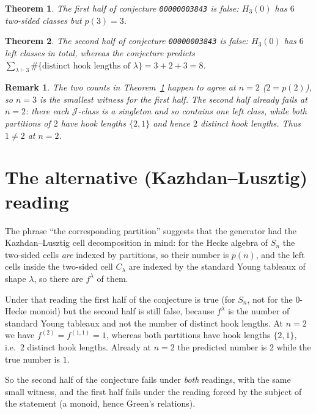 \documentclass[11pt]{article}
\newtheorem{theorem}{Theorem}
\newtheorem{remark}{Remark}
\begin{document}
\begin{theorem}\label{thm:one}
The first half of conjecture \texttt{00000003843} is false: $H_3(0)$ has $6$
two-sided classes but $p(3) = 3$.
\end{theorem}

\begin{theorem}\label{thm:two}
The second half of conjecture \texttt{00000003843} is false: $H_3(0)$ has $6$
left classes in total, whereas the conjecture predicts
$\sum_{\lambda\vdash 3}\#\{\text{distinct hook lengths of }\lambda\}
= 3 + 2 + 3 = 8$.
\end{theorem}

\begin{remark}
The two counts in Theorem~\ref{thm:one} happen to agree at $n = 2$
($2 = p(2)$), so $n = 3$ is the smallest witness for the first half.  The second
half already fails at $n = 2$: there each $\mathcal{J}$-class is a singleton and
so contains one left class, while both partitions of $2$ have hook lengths
$\{2,1\}$ and hence $2$ distinct hook lengths.  Thus $1 \ne 2$ at $n = 2$.
\end{remark}

\section{The alternative (Kazhdan--Lusztig) reading}
\label{sec:kl}

The phrase ``the corresponding partition'' suggests that the generator had the
Kazhdan--Lusztig cell decomposition in mind: for the Hecke algebra of $S_n$ the
two-sided cells \emph{are} indexed by partitions, so their number is $p(n)$, and
the left cells inside the two-sided cell $C_\lambda$ are indexed by the standard
Young tableaux of shape $\lambda$, so there are $f^\lambda$ of them.

Under that reading the first half of the conjecture is true (for $S_n$, not for
the $0$-Hecke monoid) but the second half is still false, because
$f^\lambda$ is the number of standard Young tableaux and not the number of
distinct hook lengths.  At $n = 2$ we have $f^{(2)} = f^{(1,1)} = 1$, whereas
both partitions have hook lengths $\{2,1\}$, i.e.\ $2$ distinct hook lengths.
Already at $n = 2$ the predicted number is $2$ while the true number is $1$.

So the second half of the conjecture fails under \emph{both} readings, with the
same small witness, and the first half fails under the reading forced by the
subject of the statement (a monoid, hence Green's relations).
\end{document}
